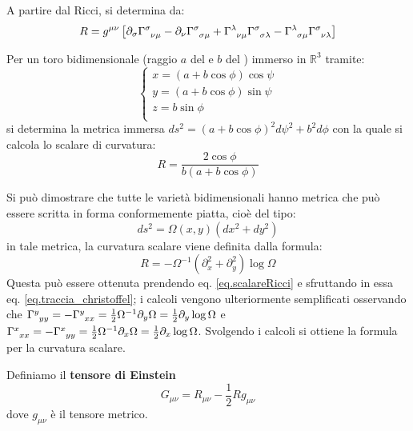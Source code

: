 A partire dal Ricci, si determina da:
\begin{equation}
    R = g^{\mu\nu}\left[
    \partial_\sigma\tensor{\Gamma}{^\sigma_{\nu\mu}}- \partial_\nu\tensor{\Gamma}{^\sigma_{\sigma\mu}} +\tensor{\Gamma}{^\lambda_{\nu\mu}} \tensor{\Gamma}{^\sigma_{\sigma\lambda}} - \tensor{\Gamma}{^\lambda_{\sigma\mu}} \tensor{\Gamma}{^\sigma_{\nu\lambda}}
    \right]
    \label{eq.scalareRicci}
\end{equation}
\begin{esempio}
    Per un toro bidimensionale (raggio $a$ del  e $b$ del ) immerso in $\mathbb{R}^3$ tramite:
    \begin{equation*}
        \left\{\begin{array}{l}
            x =(a+b\cos\phi)\cos\psi\\
            y =(a+b\cos\phi)\sin\psi\\
            z =b\sin\phi\\
        \end{array}\right.
    \end{equation*}
    si determina la metrica immersa $ds^2 = (a+b\cos\phi)^2d\psi^2 + b^2d\phi$ con la quale si calcola lo scalare di curvatura:
    \begin{equation*}
        R= \frac{2\cos\phi}{b(a+b\cos\phi)}
    \end{equation*}
\end{esempio}

Si può dimostrare che tutte le varietà bidimensionali hanno metrica che può essere scritta in forma conformemente piatta, cioè del tipo:
\begin{equation*}
    ds^2 = \Omega(x,y)(dx^2+dy^2)
\end{equation*}
in tale metrica, la curvatura scalare viene definita dalla formula:
\begin{equation}
    R =- \Omega^{-1}(\partial^2_x + \partial^2_y)\log\Omega
    \label{eq.curvatura_conforme}
\end{equation}
Questa può essere ottenuta prendendo eq. \ref{eq.scalareRicci} e sfruttando in essa eq. \ref{eq.traccia_christoffel}; i calcoli vengono ulteriormente semplificati osservando che $\tensor{\Gamma}{^y_{yy}}= - \tensor{\Gamma}{^y_{xx}} = \frac{1}{2}\Omega^{-1}\partial_y\Omega = \frac{1}{2}\partial_y\log\Omega$ e $\tensor{\Gamma}{^x_{xx}}= - \tensor{\Gamma}{^x_{yy}}= \frac{1}{2}\Omega^{-1}\partial_x\Omega = \frac{1}{2}\partial_x\log\Omega$. Svolgendo i calcoli si ottiene la formula per la curvatura scalare.
\begin{definizione}
Definiamo il \textbf{tensore di Einstein}
\begin{equation*}
    G_{\mu\nu} = R_{\mu\nu} - \frac{1}{2}R g_{\mu\nu}
\end{equation*}
dove $g_{\mu\nu}$ è il tensore metrico.
\end{definizione}

